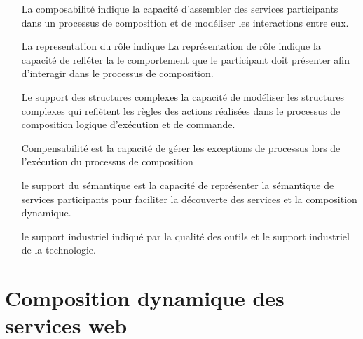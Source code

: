     \SpecialItem
    \begin{itemize}
      \item [La composabilité] indique la capacité
        d'assembler des services participants dans un processus de
        composition et de modéliser les interactions entre eux.

      \item [La representation du rôle] indique La représentation de
        rôle indique la capacité de refléter la le comportement que le
        participant doit présenter afin d'interagir dans le processus
        de composition.

      \item [Le support des structures complexes] la capacité de
        modéliser les structures complexes qui reflètent les règles
        des actions réalisées dans le processus de composition logique
        d'exécution et de commande.

      \item [Compensabilité] est la capacité de gérer les
        exceptions de processus lors de l'exécution du processus de
        composition

      \item [le support du sémantique] est la capacité de représenter
        la sémantique de services participants pour faciliter la
        découverte des services et la composition dynamique.

      \item [le support industriel] indiqué par la qualité des outils
        et le support industriel de la technologie.
    \end{itemize}

  \section{Composition dynamique des services web}
  \label{sec:comp-dynam}

